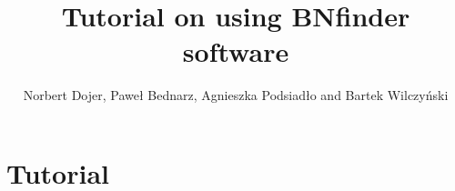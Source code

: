 \documentclass{howto}
\title{Tutorial on using BNfinder software}
\author{Norbert Dojer, Paweł Bednarz, Agnieszka Podsiadło and Bartek Wilczy\'nski }
\begin{document}
\maketitle
\tableofcontents

\section{Tutorial}






\end{document}
